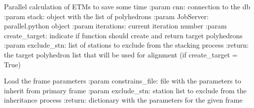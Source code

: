 \documentclass[letterpaper,10pt,english]{sphinxmanual}
\begin{document}
\begin{fulllineitems}
\label{\detokenize{pgamit.com:pgamit.com.Stacker.calculate_etms}}
\pysigstartsignatures
\pysiglinewithargsret
{}
{\sphinxparamcomma {}\sphinxparamcomma {}\sphinxparamcomma {}\sphinxparamcomma {}\sphinxparamcomma {}}
{}
\pysigstopsignatures
\sphinxAtStartPar
Parallel calculation of ETMs to save some time
:param cnn: connection to the db
:param stack: object with the list of polyhedrons
:param JobServer: parallel.python object
:param iterations: current iteration number
:param create\_target: indicate if function should create and return target polyhedrons
:param exclude\_stn: list of stations to exclude from the stacking process
:return: the target polyhedron list that will be used for alignment (if create\_target = True)

\end{fulllineitems}


\begin{fulllineitems}
\label{\detokenize{pgamit.com:pgamit.com.Stacker.callback_handler}}
\pysigstartsignatures
\pysiglinewithargsret
{}
{}
{}
\pysigstopsignatures
\end{fulllineitems}


\begin{fulllineitems}
\label{\detokenize{pgamit.com:pgamit.com.Stacker.load_constrains}}
\pysigstartsignatures
\pysiglinewithargsret
{}
{\sphinxparamcomma {}}
{}
\pysigstopsignatures
\sphinxAtStartPar
Load the frame parameters
:param constrains\_file: file with the parameters to inherit from primary frame
:param exclude\_stn:     station list to exclude from the inheritance process
:return: dictionary with the parameters for the given frame

\end{fulllineitems}
\end{document}
